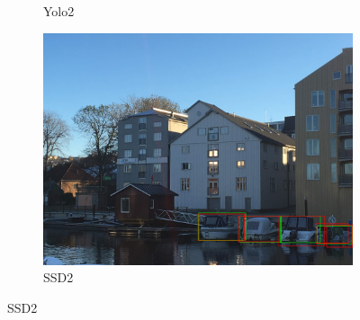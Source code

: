 \begin{figure}[h!]
\begin{subfigure}{.5\textwidth}
  \caption{Yolo2}
  \label{fig:ex_bbnb_yolo2}
\end{subfigure}%
\begin{subfigure}{.5\textwidth}
  \centering
  \includegraphics[width=.8\linewidth]{results/case_buildings/prec_recall/ssd/IMG_2077_bbnb.jpg}
  \caption{SSD2}
  \label{fig:ex_bbnb_ssd2}
\end{subfigure}


\end{figure}
